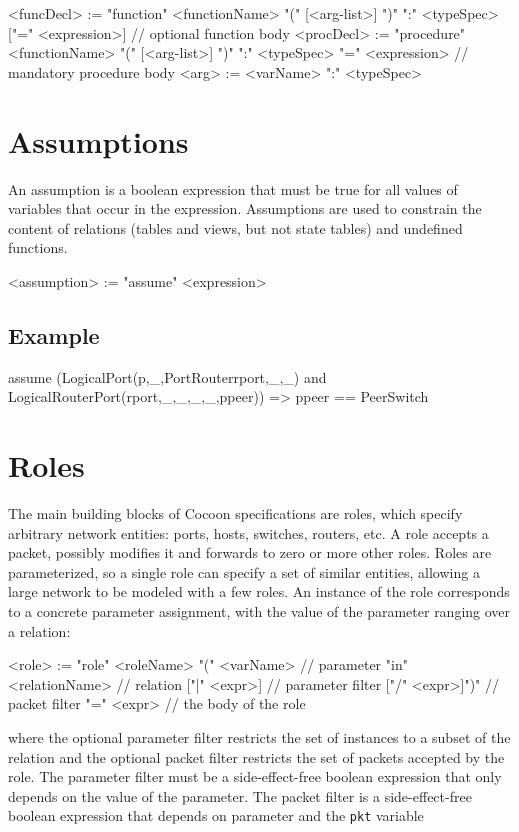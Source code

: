\documentclass{report}
\newcommand{\src}[1]{\texttt{#1}}
\begin{document}
\begin{bnflisting}{}
<funcDecl> := "function" <functionName> "(" [<arg-list>] ")" ":" <typeSpec>
                         ["=" <expression>] // optional function body
<procDecl> := "procedure" <functionName> "(" [<arg-list>] ")" ":" <typeSpec>
                         "=" <expression>   // mandatory procedure body
<arg> := <varName> ":" <typeSpec>
\end{bnflisting}

\section{Assumptions}

An assumption is a boolean expression that must be true for all values of variables 
that occur in the expression.  Assumptions are used to constrain the content of
relations (tables and views, but not state tables) and undefined functions.  

\begin{bnflisting}{}
<assumption> := "assume" <expression>
\end{bnflisting}

\subsection*{Example}

\begin{ccnlisting}{}
assume (LogicalPort(p,_,PortRouter{rport},_,_) and 
        LogicalRouterPort(rport,_,_,_,_,ppeer))
       => ppeer == PeerSwitch
\end{ccnlisting}

\section{Roles}

The main building blocks of Cocoon specifications are roles, 
which specify arbitrary network entities:
ports, hosts, switches, routers, etc. A role accepts a packet,
possibly modifies it and forwards to zero or more other
roles. Roles are parameterized, so a single role can specify a 
set of similar entities, allowing a large network to
be modeled with a few roles.  An instance of the role corresponds 
to a concrete parameter assignment, with the value of the parameter
ranging over a relation:
\begin{bnflisting}{}
<role> := "role" <roleName> "(" <varName>           // parameter
                                "in" <relationName> // relation
                                 ["|" <expr>]       // parameter filter
                                 ["/" <expr>]")"    // packet filter
          "=" <expr>                        // the body of the role
\end{bnflisting}
where the optional parameter filter restricts the set of instances to a subset
of the relation and the optional packet filter restricts the set of packets accepted 
by the role.  The parameter filter must be a side-effect-free boolean 
expression that only depends on the value of the parameter.  The packet
filter is a side-effect-free boolean expression that depends on parameter
and the \src{pkt} variable
\end{document}
